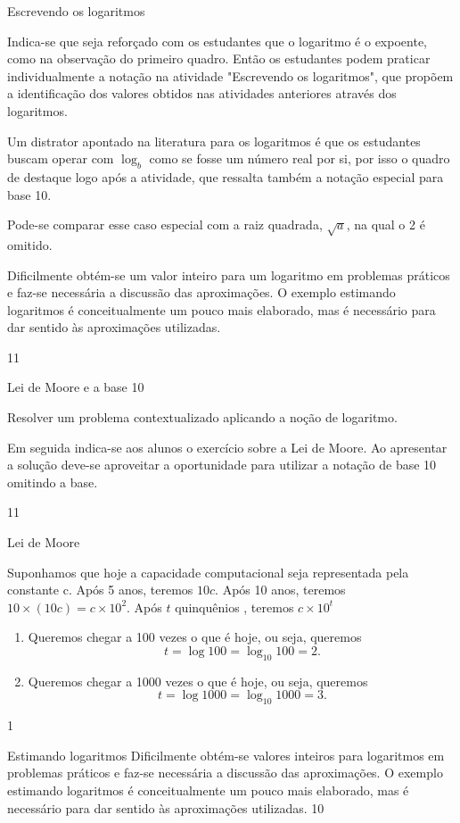 \begin{sugestions}{Escrevendo os logaritmos}
{
	Indica-se que seja reforçado com os estudantes que o logaritmo é o expoente, como na observação do primeiro quadro. Então os estudantes podem praticar individualmente a notação na atividade "Escrevendo os logaritmos", que propõem a identificação dos valores obtidos nas atividades anteriores através dos logaritmos.


	Um distrator apontado na literatura para os logaritmos é que os estudantes buscam operar com $\log_b$ como se fosse um número real por si, por isso o quadro de destaque logo após a atividade, que ressalta também a notação especial para base 10.

	Pode-se comparar esse caso especial com a raiz quadrada, $\sqrt{a}$, na qual o 2 é omitido.

	Dificilmente obtém-se um valor inteiro para um logaritmo em problemas práticos e faz-se necessária a discussão das aproximações. O exemplo estimando logaritmos é conceitualmente um pouco mais elaborado, mas é necessário para dar sentido às aproximações utilizadas.
}
{1}{1}
\end{sugestions}
\begin{objectives}{Lei de Moore e a base 10}
{
	Resolver um problema contextualizado aplicando a noção de logaritmo.

	Em seguida indica-se aos alunos o exercício sobre a Lei de Moore. Ao apresentar a solução deve-se aproveitar a oportunidade para utilizar a notação de base 10 omitindo a base.
}{1}{1}
\end{objectives}
\begin{answer}{Lei de Moore}
{
	Suponhamos que hoje a capacidade computacional seja representada pela constante c. Após 5 anos, teremos $10c$. Após 10 anos, teremos $10 \times (10c) = c \times 10^2$. Após $t$ quinquênios , teremos $c \times 10^t$
	\begin{enumerate} 
	\item Queremos chegar a 100 vezes o que é hoje, ou seja, queremos
	$$
	t = \log 100 = \log_{10} 100  = 2.
	$$
	\item Queremos chegar a 1000 vezes o que é hoje, ou seja, queremos
	$$
	t = \log 1000 = \log_{10} 1000  = 3.
	$$
	\end{enumerate} 
}{1}
\end{answer}
\clearmargin
\begin{sugestions}{Estimando logaritmos}
{
	Dificilmente obtém-se valores inteiros para logaritmos em problemas práticos e faz-se necessária a discussão das aproximações. O exemplo estimando logaritmos é conceitualmente um pouco mais elaborado, mas é necessário para dar sentido às aproximações utilizadas.
}{1}{0}
\end{sugestions}

